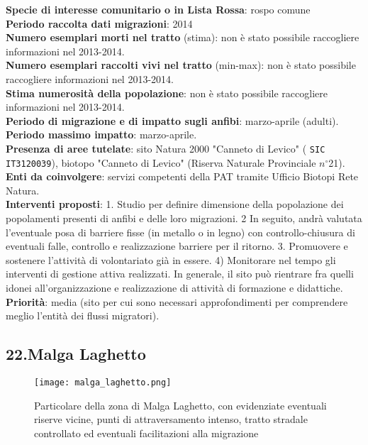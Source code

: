 \documentclass[11pt,a4paper,twoside]{memoir}
\begin{document}
\textbf{Specie di interesse comunitario o in Lista Rossa}: rospo comune \\
\textbf{Periodo raccolta dati migrazioni}: 2014 \\
\textbf{Numero esemplari morti nel tratto} (stima): non è stato possibile raccogliere informazioni nel 2013-2014. \\
\textbf{Numero esemplari raccolti vivi nel tratto} (min-max): non è stato possibile raccogliere informazioni nel 2013-2014. \\
\textbf{Stima numerosità della popolazione}: non è stato possibile raccogliere informazioni nel 2013-2014. \\   
\textbf{Periodo di migrazione e di impatto sugli anfibi}: marzo-aprile (adulti). \\
\textbf{Periodo massimo impatto}: marzo-aprile. \\
\textbf{Presenza di aree tutelate}: sito Natura 2000 "Canneto di Levico" ( \texttt{SIC IT3120039}), biotopo "Canneto di Levico" (Riserva Naturale Provinciale $n^{\circ}$21). \\
\textbf{Enti da coinvolgere}: servizi competenti della PAT tramite Ufficio Biotopi Rete Natura. \\
\textbf{Interventi proposti}: 1. Studio per definire dimensione della popolazione dei popolamenti presenti di anfibi e delle loro migrazioni. 2 In seguito, andrà valutata l'eventuale posa di barriere fisse (in metallo o in legno) con controllo-chiusura di eventuali falle, controllo e realizzazione barriere per il ritorno. 3. Promuovere e sostenere l’attività di volontariato già in essere. 4) Monitorare nel tempo gli interventi di gestione attiva realizzati. In generale, il sito può rientrare fra quelli idonei all’organizzazione e realizzazione di attività di formazione e didattiche. \\
\textbf{Priorità}: media (sito per cui sono necessari approfondimenti per comprendere meglio l'entità dei flussi migratori). \\

\newpage
\begin{tcolorbox}[breakable,colback=white,colframe=red,width=10cm]
\subsection{22.Malga Laghetto}
\end{tcolorbox}

\begin{figure}[H]
\label{fig:map_laghetto}
\centering
  \texttt{[image: malga\_laghetto.png]}
\caption{Particolare della zona di Malga Laghetto, con evidenziate eventuali riserve vicine, punti di attraversamento intenso, tratto stradale controllato ed eventuali facilitazioni alla migrazione}
\end{figure}
\end{document}
